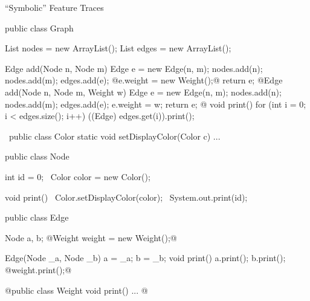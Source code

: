 \begin{frame}[fragile]{``Symbolic'' Feature Traces}
	\begin{tiny}
		\begin{mycolumns}
\begin{codetight}{}
public class Graph {
	List nodes = new ArrayList();
	List edges = new ArrayList();

	Edge add(Node n, Node m) {
		Edge e = new Edge(n, m);
		nodes.add(n); nodes.add(m); edges.add(e);
		@e.weight = new Weight();@
		return e;
	}
	@Edge add(Node n, Node m, Weight w) {
		Edge e = new Edge(n, m);
		nodes.add(n); nodes.add(m); edges.add(e);
		e.weight = w;
		return e;
	}@
	void print() {
		for (int i = 0; i < edges.size(); i++) {
			((Edge) edges.get(i)).print();
		}
	}
}
\end{codetight}
\begin{codetight}{}
~public class Color {
	static void setDisplayColor(Color c) {...}
}~
\end{codetight}	
		\mynextcolumn
\begin{codetight}{}
public class Node {
	int id = 0;
	~Color color = new Color();~

	void print() {
		~Color.setDisplayColor(color);~
		System.out.print(id);
	}
}
\end{codetight}
\begin{codetight}{}
public class Edge {
	Node a, b;
	@Weight weight = new Weight();@

	Edge(Node _a, Node _b) {
		a = _a; b = _b;
	}
	void print() {
		a.print(); b.print();
		@weight.print();@
	}
}
\end{codetight}
\begin{codetight}{}
@public class Weight {
	void print() {...}
}@
\end{codetight}
		\end{mycolumns}
	\end{tiny}
\end{frame}

